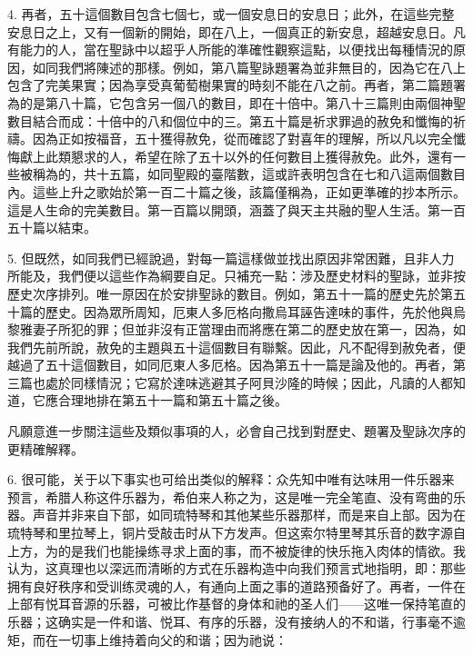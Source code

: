 4. 再者，五十這個數目包含七個七，或一個安息日的安息日；此外，在這些完整安息日之上，又有一個新的開始，即在八上，一個真正的新安息，超越安息日。凡有能力的人，當在聖詠中以超乎人所能的準確性觀察這點，以便找出每種情況的原因，如同我們將陳述的那樣。例如，第八篇聖詠題署為並非無目的，因為它在八上包含了完美果實；因為享受真葡萄樹果實的時刻不能在八之前。再者，第二篇題署為的是第八十篇，它包含另一個八的數目，即在十倍中。第八十三篇則由兩個神聖數目結合而成：十倍中的八和個位中的三。第五十篇是祈求罪過的赦免和懺悔的祈禱。因為正如按福音，五十獲得赦免，從而確認了對喜年的理解，所以凡以完全懺悔獻上此類懇求的人，希望在除了五十以外的任何數目上獲得赦免。此外，還有一些被稱為的，共十五篇，如同聖殿的臺階數，這或許表明包含在七和八這兩個數目內。這些上升之歌始於第一百二十篇之後，該篇僅稱為，正如更準確的抄本所示。這是人生命的完美數目。第一百篇以開頭，涵蓋了與天主共融的聖人生活。第一百五十篇以結束。\par

5. 但既然，如同我們已經說過，對每一篇這樣做並找出原因非常困難，且非人力所能及，我們便以這些作為綱要自足。只補充一點：涉及歷史材料的聖詠，並非按歷史次序排列。唯一原因在於安排聖詠的數目。例如，第五十一篇的歷史先於第五十篇的歷史。因為眾所周知，厄東人多厄格向撒烏耳誣告達味的事件，先於他與烏黎雅妻子所犯的罪；但並非沒有正當理由而將應在第二的歷史放在第一，因為，如我們先前所說，赦免的主題與五十這個數目有聯繫。因此，凡不配得到赦免者，便越過了五十這個數目，如同厄東人多厄格。因為第五十一篇是論及他的。再者，第三篇也處於同樣情況；它寫於達味逃避其子阿貝沙隆的時候；因此，凡讀的人都知道，它應合理地排在第五十一篇和第五十篇之後。\par

凡願意進一步關注這些及類似事項的人，必會自己找到對歷史、題署及聖詠次序的更精確解釋。\par

6. 很可能，关于以下事实也可给出类似的解释：众先知中唯有达味用一件乐器来预言，希腊人称这件乐器为，希伯来人称之为，这是唯一完全笔直、没有弯曲的乐器。声音并非来自下部，如同琉特琴和其他某些乐器那样，而是来自上部。因为在琉特琴和里拉琴上，铜片受敲击时从下方发声。但这索尔特里琴其乐音的数字源自上方，为的是我们也能操练寻求上面的事，而不被旋律的快乐拖入肉体的情欲。我认为，这真理也以深远而清晰的方式在乐器构造中向我们预言式地指明，即：那些拥有良好秩序和受训练灵魂的人，有通向上面之事的道路预备好了。再者，一件在上部有悦耳音源的乐器，可被比作基督的身体和祂的圣人们——这唯一保持笔直的乐器；这确实是一件和谐、悦耳、有序的乐器，没有接纳人的不和谐，行事毫不逾矩，而在一切事上维持着向父的和谐；因为祂说：\par


